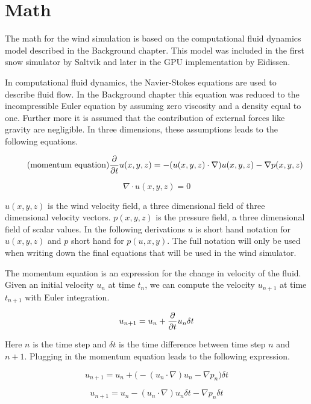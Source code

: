 \section{Math}

The math for the wind simulation is based on the computational fluid dynamics
model described in the Background chapter. This model was included in the first 
snow simulator by Saltvik\cite{originalSnowThesis} and later in the GPU 
implementation by Eidissen\cite{gpuSnowThesis}.

In computational fluid dynamics, the Navier-Stokes equations are used to describe 
fluid flow. In the Background chapter this equation was reduced to the 
incompressible Euler equation by assuming zero viscosity and a density equal to 
one. Further more it is assumed that the contribution of external forces like 
gravity are negligible. In three dimensions, these assumptions leads to the 
following equations. 

\begin{equation} 
	\tag{momentum equation}
	\frac{\partial}{\partial t}u(x, y, z)  = -(u(x, y, z) \cdot \nabla)u(x, y, z) - \nabla p(x, y, z)
\end{equation}

\begin{equation}
	\tag{continuity equation}
	\nabla \cdot u(x, y, z) = 0
\end{equation}

$u(x, y, z)$ is the wind velocity field, a three dimensional field of three
dimensional velocity vectors. $p(x, y, z)$ is the pressure field, a three
dimensional field of scalar values. In the following derivations $u$ is short
hand notation for $u(x, y, z)$ and $p$ short hand for $p(u, x, y)$. The full
notation will only be used when writing down the final equations that will be 
used in the wind simulator.

The momentum equation is an expression for the change in velocity of the
fluid. Given an initial velocity $u_n$ at time $t_n$, we can compute the velocity 
$u_{n+1}$ at time $t_{n+1}$ with Euler integration.

$$ u_{n+1} = u_n + \frac{\partial}{\partial t}u_n \delta t $$

Here $n$ is the time step and $\delta t$ is the time difference between time step 
$n$ and $n+1$. Plugging in the momentum equation leads to the following expression.

$$ u_{n+1} = u_n + \big( -(u_n \cdot \nabla)u_n - \nabla p_n \big) \delta t $$

$$ u_{n+1} = u_n - (u_n \cdot \nabla)u_n \delta t - \nabla p_n \delta t $$

